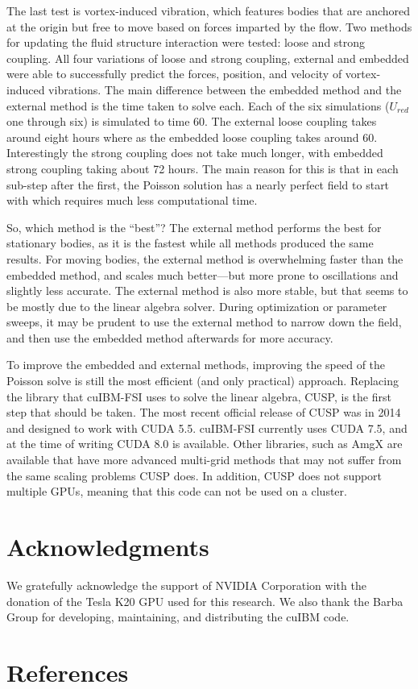 \documentclass[preprint,12pt,5p]{elsarticle}
\begin{document}
The last test is vortex-induced vibration, which features bodies that are anchored at the origin but free to move based on forces imparted by the flow. 
Two methods for updating the fluid structure interaction were tested: loose and strong coupling. 
All four variations of loose and strong coupling, external and embedded were able to successfully predict the forces, position, and velocity of vortex-induced vibrations. 
The main difference between the embedded method and the external method is the time taken to solve each. 
Each of the six simulations ($U_{red}$ one through six) is simulated to time 60. 
The external loose coupling takes around eight hours where as the embedded loose coupling takes around 60. 
Interestingly the strong coupling does not take much longer, with embedded strong coupling taking about 72 hours. 
The main reason for this is that in each sub-step after the first, the Poisson solution has a nearly perfect field to start with which requires much less computational time. 

So, which method is the ``best''? 
The external method performs the best for stationary bodies, as it is the fastest while all methods produced the same results. 
For moving bodies, the external method is overwhelming faster than the embedded method, and scales much better---but more prone to oscillations and slightly less accurate. 
The external method is also more stable, but that seems to be mostly due to the linear algebra solver.
During optimization or parameter sweeps, it may be prudent to use the external method to narrow down the field, and then use the embedded method afterwards for more accuracy. 

To improve the embedded and external methods, improving the speed of the Poisson solve is still the most efficient (and only practical) approach. 
Replacing the library that cuIBM-FSI uses to solve the linear algebra, CUSP, is the first step that should be taken.
The most recent official release of CUSP was in 2014 and designed to work with CUDA 5.5. 
cuIBM-FSI currently uses CUDA 7.5, and at the time of writing CUDA 8.0 is available. 
Other libraries, such as AmgX are available that have more advanced multi-grid methods that may not suffer from the same scaling problems CUSP does. 
In addition, CUSP does not support multiple GPUs, meaning that this code can not be used on a cluster. 

\section*{Acknowledgments}
We gratefully acknowledge the support of NVIDIA Corporation with the donation of the Tesla K20 GPU used for this research.
We also thank the Barba Group for developing, maintaining, and distributing the cuIBM code. 


\pagebreak
\section*{References}


\end{document}
